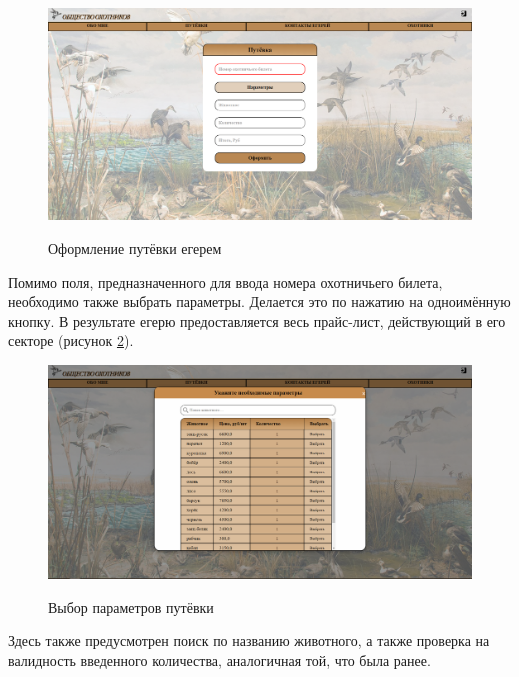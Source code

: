 	\begin{figure}[h]
		\centering
		\begin{center}
			{\includegraphics[scale=0.34]{schemes/screens/create_huntsman.png}}
			\caption{Оформление путёвки егерем}
			\label{fig28:image}
		\end{center}
	\end{figure}
	\newpage

	Помимо поля, предназначенного для ввода номера охотничьего билета, необходимо также выбрать параметры. Делается это по нажатию на одноимённую кнопку. В результате егерю предоставляется весь прайс-лист, действующий в его секторе (рисунок \ref{fig29:image}).
	
	\begin{figure}[h!]
		\centering
		\begin{center}
			{\includegraphics[scale=0.34]{schemes/screens/price_list_huntsman.png}}
			\caption{Выбор параметров путёвки}
			\label{fig29:image}
		\end{center}
	\end{figure}

	Здесь также предусмотрен поиск по названию животного, а также проверка на валидность введенного количества, аналогичная той, что была ранее.
	
